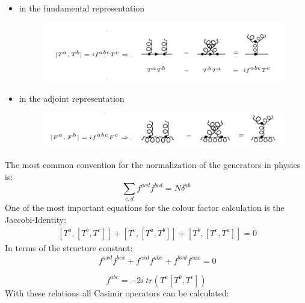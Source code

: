 \begin{itemize}
\item in the fundamental representation
\begin{figure}[h!]
\centering
\includegraphics[scale=0.6]{images/Intro/Casimir.png}
\end{figure}
\item in the adjoint representation\\
\begin{figure}[h!]
\centering
\includegraphics[scale=0.6]{images/Intro/CasimirAdj.png}
\end{figure}
\end{itemize}

The most common convention for the normalization of the generators in physics is:
\begin{equation}
\displaystyle\sum\limits_{c,d} f^{acd} f^{bcd} = N \delta^{ab}
\end{equation}
One of the most important equations for the colour factor calculation is the Jaccobi-Identity:
\begin{equation}
\begin{split}\:
[T^a, [T^b , T^c]]+[T^c, [T^a , T^b]]+[T^b, [T^c , T^a]]=0
\end{split}
\end{equation}
In terms of the structure constant:
\begin{equation}
\begin{split}\:
f^{axd} f^{bcx} +  f^{cxd} f^{abx} +f^{bxd} f^{cax} =0
\end{split}
\end{equation}

\begin{equation}
f^{abc} = -2i\: tr(T^a[T^b, T^c])
\end{equation}
\newpage
With these relations all Casimir operators can be calculated:

